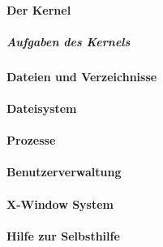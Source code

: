 \paragraph{Der Kernel}

\subparagraph{Aufgaben des Kernels}

\paragraph{Dateien und Verzeichnisse}

\paragraph{Dateisystem}

\paragraph{Prozesse}

\paragraph{Benutzerverwaltung}

\paragraph{X-Window System}

\paragraph{Hilfe zur Selbsthilfe}





